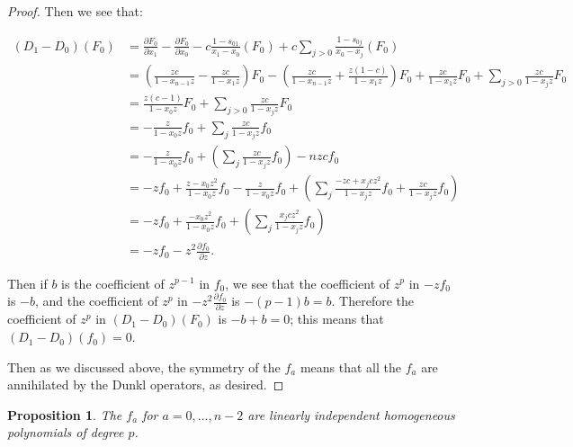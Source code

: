 \documentclass{article}
\numberwithin{equation}{section}
\newtheorem{proposition}[equation]{Proposition}
\begin{document}
\begin{proof}
Then we see that:

\begin{align*}
(D_1-D_0)(F_0)&=\frac{\partial F_0}{\partial x_1}-\frac{\partial F_0}{\partial x_0}-c\frac{1-s_{01}}{x_1-x_0}(F_0)+c\sum_{j>0}\frac{1-s_{0j}}{x_0-x_j}(F_0)\\
&=\left(\frac{zc}{1-x_{n-1}z}-\frac{zc}{1-x_1z}\right)F_0-\left(\frac{zc}{1-x_{n-1}z}+\frac{z(1-c)}{1-x_1z}\right)F_0+\frac{zc}{1-x_1z}F_0+\sum_{j>0}\frac{zc}{1-x_jz}F_0\\
&=\frac{z(c-1)}{1-x_0z}F_0+\sum_{j>0}\frac{zc}{1-x_jz}F_0\\
&=-\frac{z}{1-x_0z}f_0+\sum_{j} \frac{zc}{1-x_jz}f_0\\
&=-\frac{z}{1-x_0z}f_0+\left(\sum_{j} \frac{zc}{1-x_jz}f_0\right)-nzcf_0\\
&=-zf_0+\frac{z-x_0z^2}{1-x_0z}f_0-\frac{z}{1-x_0z}f_0+\left(\sum_{j} \frac{-zc+x_jcz^2}{1-x_jz}f_0+\frac{zc}{1-x_jz}f_0\right)\\
&=-zf_0+\frac{-x_0z^2}{1-x_0z}f_0+\left(\sum_{j} \frac{x_jcz^2}{1-x_jz}f_0\right)\\
&=-zf_0-z^2\frac{\partial f_0}{\partial z}.
\end{align*}

Then if $b$ is the coefficient of $z^{p-1}$ in $f_0$, we see that the coefficient of $z^p$ in $-zf_0$ is $-b$, and the coefficient of $z^p$ in $-z^2\frac{\partial f_0}{\partial z}$ is $-(p-1)b=b$. Therefore the coefficient of $z^p$ in $(D_1-D_0)(F_0)$ is $-b+b=0$; this means that $(D_1-D_0)(f_0)=0$. 

Then as we discussed above, the symmetry of the $f_a$ means that all the $f_a$ are annihilated by the Dunkl operators, as desired.

\end{proof}

\begin{proposition}\label{prop:linind} The $f_a$ for $a=0,\dots,n-2$ are linearly independent homogeneous polynomials of degree $p$.
\end{proposition} 
\end{document}
